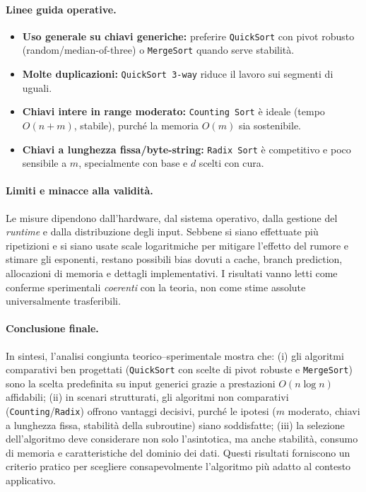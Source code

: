 \documentclass[a4paper, 11pt]{article}
\begin{document}
\paragraph{Linee guida operative.}
\begin{itemize}
  \item \textbf{Uso generale su chiavi generiche:} preferire \texttt{QuickSort} con pivot robusto (random/median-of-three) o \texttt{MergeSort} quando serve stabilità.
  \item \textbf{Molte duplicazioni:} \texttt{QuickSort 3-way} riduce il lavoro sui segmenti di uguali.
  \item \textbf{Chiavi intere in range moderato:} \texttt{Counting Sort} è ideale (tempo \(O(n+m)\), stabile), purché la memoria \(O(m)\) sia sostenibile.
  \item \textbf{Chiavi a lunghezza fissa/byte-string:} \texttt{Radix Sort} è competitivo e poco sensibile a \(m\), specialmente con base e \(d\) scelti con cura.
\end{itemize}

\paragraph{Limiti e minacce alla validità.}
Le misure dipendono dall'hardware, dal sistema operativo, dalla gestione del \emph{runtime} e dalla distribuzione degli input. 
Sebbene si siano effettuate più ripetizioni e si siano usate scale logaritmiche per mitigare l'effetto del rumore e stimare gli esponenti, restano possibili bias dovuti a cache, branch prediction, allocazioni di memoria e dettagli implementativi. 
I risultati vanno letti come conferme sperimentali \emph{coerenti} con la teoria, non come stime assolute universalmente trasferibili.

\paragraph{Conclusione finale.}
In sintesi, l'analisi congiunta teorico--sperimentale mostra che:
(i) gli algoritmi comparativi ben progettati (\texttt{QuickSort} con scelte di pivot robuste e \texttt{MergeSort}) sono la scelta predefinita su input generici grazie a prestazioni \(O(n\log n)\) affidabili; 
(ii) in scenari strutturati, gli algoritmi non comparativi (\texttt{Counting}/\texttt{Radix}) offrono vantaggi decisivi, purché le ipotesi (\(m\) moderato, chiavi a lunghezza fissa, stabilità della subroutine) siano soddisfatte; 
(iii) la selezione dell'algoritmo deve considerare non solo l'asintotica, ma anche stabilità, consumo di memoria e caratteristiche del dominio dei dati. 
Questi risultati forniscono un criterio pratico per scegliere consapevolmente l'algoritmo più adatto al contesto applicativo.
\end{document}
